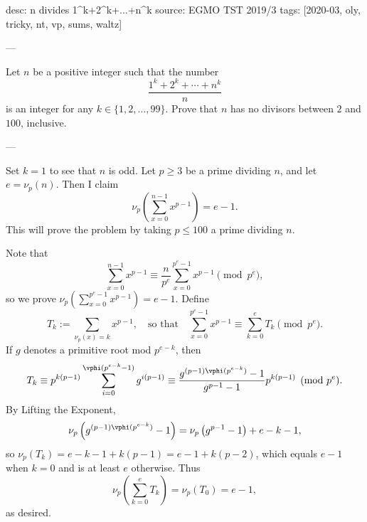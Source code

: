 desc: n divides 1^k+2^k+...+n^k
source: EGMO TST 2019/3
tags: [2020-03, oly, tricky, nt, vp, sums, waltz]

---

Let $n$ be a positive integer such that the number \[\frac{1^k+2^k+\cdots+n^k}n\]
is an integer for any $k\in\{1,2,\ldots,99\}$. Prove that $n$ has no divisors between $2$ and $100$, inclusive.

---

Set $k=1$ to see that $n$ is odd. Let $p\ge3$ be a prime dividing $n$, and let $e=\nu_p(n)$. Then I claim \[\nu_p\left(\sum_{x=0}^{n-1}x^{p-1}\right)=e-1.\]
This will prove the problem by taking $p\le100$ a prime dividing $n$.

Note that \[\sum_{x=0}^{n-1}x^{p-1}\equiv\frac n{p^e}\sum_{x=0}^{p^e-1}x^{p-1}\pmod{p^e},\]
so we prove $\nu_p\left(\sum_{x=0}^{p^e-1}x^{p-1}\right)=e-1$. Define \[T_k:=\sum_{\nu_p(x)=k}x^{p-1},\quad\text{so that}\quad\sum_{x=0}^{p^e-1}x^{p-1}\equiv\sum_{k=0}^eT_k\pmod{p^e}.\]
If $g$ denotes a primitive root mod $p^{e-k}$, then \[T_k\equiv p^{k(p-1)}\sum_{i=0}^{\vphi(p^{e-k}-1)}g^{i(p-1)}\equiv\frac{g^{(p-1)\vphi(p^{e-k})}-1}{g^{p-1}-1}p^{k(p-1)}\pmod{p^e}.\]
By Lifting the Exponent, \[\nu_p\left(g^{(p-1)\vphi(p^{e-k})}-1\right)=\nu_p\left(g^{p-1}-1\right)+e-k-1,\]
so $\nu_p(T_k)=e-k-1+k(p-1)=e-1+k(p-2)$, which equals $e-1$ when $k=0$ and is at least $e$ otherwise. Thus \[\nu_p\left(\sum_{k=0}^eT_k\right)=\nu_p(T_0)=e-1,\]
as desired.
